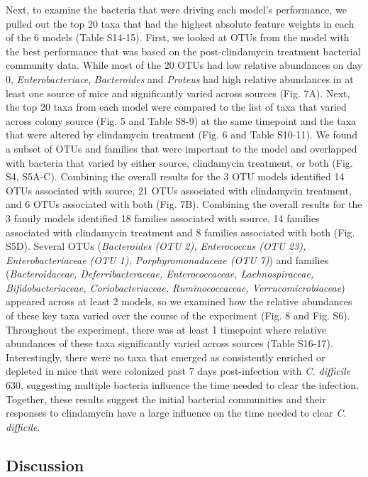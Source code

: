 \documentclass[11pt,]{article}
\begin{document}
Next, to examine the bacteria that were driving each model's
performance, we pulled out the top 20 taxa that had the highest absolute
feature weights in each of the 6 models (Table S14-15). First, we looked
at OTUs from the model with the best performance that was based on the
post-clindamycin treatment bacterial community data. While most of the
20 OTUs had low relative abundances on day 0, \emph{Enterobacteriace},
\emph{Bacteroides} and \emph{Proteus} had high relative abundances in at
least one source of mice and significantly varied across sources (Fig.
7A). Next, the top 20 taxa from each model were compared to the list of
taxa that varied across colony source (Fig. 5 and Table S8-9) at the
same timepoint and the taxa that were altered by clindamycin treatment
(Fig. 6 and Table S10-11). We found a subset of OTUs and families that
were important to the model and overlapped with bacteria that varied by
either source, clindamycin treatment, or both (Fig. S4, S5A-C).
Combining the overall results for the 3 OTU models identified 14 OTUs
associated with source, 21 OTUs associated with clindamycin treatment,
and 6 OTUs associated with both (Fig. 7B). Combining the overall results
for the 3 family models identified 18 families associated with source,
14 families associated with clindamycin treatment and 8 families
associated with both (Fig. S5D). Several OTUs (\emph{Bacteroides (OTU
2), Enterococcus (OTU 23), Enterobacteriaceae (OTU 1),
Porphyromonadaceae (OTU 7)}) and families (\emph{Bacteroidaceae,
Deferribacteraceae, Enterococcaceae, Lachnospiraceae,
Bifidobacteriaceae, Coriobacteriaceae, Ruminococcaceae,
Verrucomicrobiaceae}) appeared across at least 2 models, so we examined
how the relative abundances of these key taxa varied over the course of
the experiment (Fig. 8 and Fig. S6). Throughout the experiment, there
was at least 1 timepoint where relative abundances of these taxa
significantly varied across sources (Table S16-17). Interestingly, there
were no taxa that emerged as consistently enriched or depleted in mice
that were colonized past 7 days post-infection with \emph{C. difficile}
630, suggesting multiple bacteria influence the time needed to clear the
infection. Together, these results suggest the initial bacterial
communities and their responses to clindamycin have a large influence on
the time needed to clear \emph{C. difficile}.

\subsection{Discussion}\label{discussion}
\end{document}
